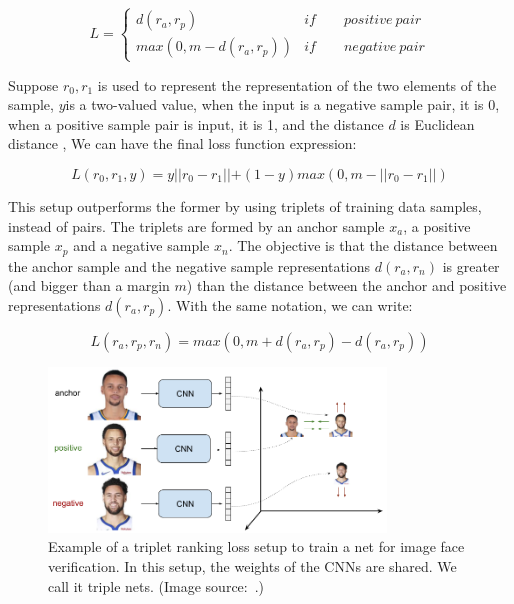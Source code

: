 \begin{equation}
L=\begin{cases}
	d(r_a,r_p) & if \qquad positive\ pair \\
	max(0,m-d(r_a,r_p)) & if \qquad negative\  pair
\end{cases}
\end{equation}

Suppose $r_0,r_1 $ is used to represent the representation of the two elements of the sample, $y$is a two-valued value, when the input is a negative sample pair, it is 0, when a positive sample pair is input, it is 1, and the distance $d$ is Euclidean distance , We can have the final loss function expression:

\begin{equation}
L(r_0,r_1,y)=y\left || r_0-r_1 \right || + (1-y)max(0,m-\left || r_0-r_1 \right ||)
\end{equation}

This setup outperforms the former by using triplets of training data samples, instead of pairs. The triplets are formed by an anchor sample $x_a$, a positive sample $x_p$ and a negative sample $x_n$. The objective is that the distance between the anchor sample and the negative sample representations $d(r_a,r_n)$ is greater (and bigger than a margin $m$) than the distance between the anchor and positive representations $d(r_a,r_p)$. With the same notation, we can write:

\begin{equation}
L(r_a,r_p,r_n)=max(0,m+d(r_a,r_p)-d(r_a,r_p))
\label{equ:ranking_loss}
\end{equation}

\begin{figure}[!htbp]
	\centering
	\includegraphics[width = 0.8\textwidth]{figures/triplet_loss_faces.png}
	\caption[Example of a triplet ranking loss ]
	{ Example of a triplet ranking loss setup to train a net for image face verification. In this setup, the weights of the CNNs are shared. We call it triple nets. (Image source:~\cite{triplet_loss_em}.)}
	\label{fig:triplet_ranking_loss}
\end{figure}


